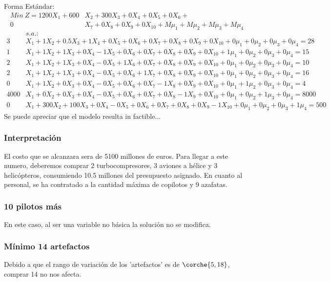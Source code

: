 \begin{homeworkProblem}
Forma Estándar:{\footnotesize
\begin{align*}
    Min\ Z = 1200X_1 + 600&X_2 + 300X_3 + 0X_4 + 0X_5 + 0X_6 + \\ 0&X_7 + 0X_8 + 0X_9 + 0X_{10} + M\mu_1 + M\mu_2 + M\mu_3 + M\mu_4
\end{align*}  
\begin{align*} 
    &s.a.: \\ 3&X_1 + 1X_2 + 0.5X_3 + 1X_4 + 0X_5 + 0X_6 + 0X_7 + 0X_8 + 0X_9 + 0X_{10} + 0\mu_1 + 0\mu_2 + 0\mu_3 + 0\mu_4  = 28 \\
    1&X_1 + 1X_2 + 1X_3 + 0X_4 - 1X_5 + 0X_6 + 0X_7 + 0X_8 + 0X_9 + 0X_{10} + 1\mu_1 + 0\mu_2 + 0\mu_3 + 0\mu_4  = 15 \\
    2&X_1 + 1X_2 + 1X_3 + 0X_4 - 0X_5 + 1X_6 + 0X_7 + 0X_8 + 0X_9 + 0X_{10} + 0\mu_1 + 0\mu_2 + 0\mu_3 + 0\mu_4  = 10 \\
    2&X_1 + 1X_2 + 1X_3 + 0X_4 - 0X_5 + 0X_6 + 1X_7 + 0X_8 + 0X_9 + 0X_{10} + 0\mu_1 + 0\mu_2 + 0\mu_3 + 0\mu_4  = 16 \\
    0&X_1 + 1X_2 + 0X_3 + 0X_4 - 0X_5 + 0X_6 + 0X_7 - 1X_8 + 0X_9 + 0X_{10} + 0\mu_1 + 1\mu_2 + 0\mu_3 + 0\mu_4  = 4 \\
    4000&X_1 + 0X_2 + 0X_3 + 0X_4 - 0X_5 + 0X_6 + 0X_7 + 0X_8 - 1X_9 + 0X_{10} + 0\mu_1 + 0\mu_2 + 1\mu_3 + 0\mu_4  = 8000 \\
    0&X_1 + 300X_2 + 100X_3 + 0X_4 - 0X_5 + 0X_6 + 0X_7 + 0X_8 + 0X_9 -  1X_{10} + 0\mu_1 + 0\mu_2 + 0\mu_3 + 1\mu_4  = 500 
\end{align*}}
Se puede apreciar que el modelo resulta in factible...
\subsubsection{Interpretación}
El costo que se alcanzara sera de 5100 millones de euros. Para llegar a este numero, deberemos comprar 2 turbocompresores, 3 aviones a hélice y 3 helicópteros, consumiendo 10.5 millones del presupuesto asignado. En cuanto al personal, se ha contratado a la cantidad máxima de copilotos y 9 azafatas.
\subsubsection{10 pilotos más}
En este caso, al ser una variable no básica la solución no se modifica.
\subsubsection{Mínimo 14 artefactos}
Debido a que el rango de variación de los 'artefactos' es de $\corche{5,18}$, comprar 14 no nos afecta.
\end{homeworkProblem}